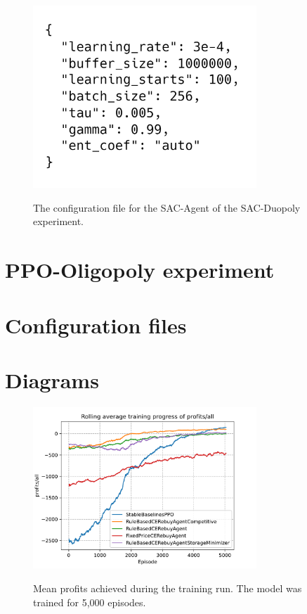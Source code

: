 \begin{figure}[ht]
	\includegraphics[width = 0.75\textwidth]{images/configs/SACDuopolyAgent.png}\\
	\caption{The configuration file for the SAC-Agent of the SAC-Duopoly experiment.}\label{fig:SACDuopolyConfigAgent}
\end{figure}

\clearpage
\section{PPO-Oligopoly experiment}\label{sec:AppendixOligopoly}

\section{Configuration files}

\section{Diagrams}

\begin{figure}[ht]
	\includegraphics[width = 0.75\textwidth]{images/experiments/PPOOligopoly/LineProfitsAll.pdf}\\
	\caption{Mean profits achieved during the training run. The model was trained for 5,000 episodes.}\label{fig:PPOOligopolyLineProfitsAll}
\end{figure}